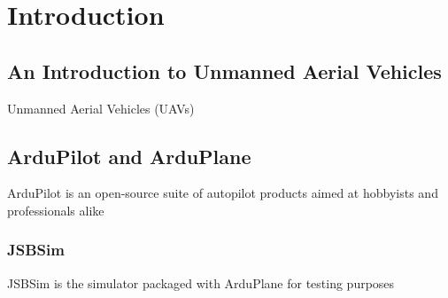 
\chapter{Introduction}  %
\label{intro}

\ifpdf
    \graphicspath{{Chapter1/Figs/Raster/}{Chapter1/Figs/PDF/}{Chapter1/Figs/}}
\else
    \graphicspath{{Chapter1/Figs/Vector/}{Chapter1/Figs/}}
\fi


\section{An Introduction to Unmanned Aerial Vehicles} %
\label{intro:UAVs}

Unmanned Aerial Vehicles (UAVs) 

\section{ArduPilot and ArduPlane} %
\label{intro:arduplane}

ArduPilot is an open-source suite of autopilot products aimed at hobbyists and professionals alike 

\subsection{JSBSim}
\label{intro:jsbsim}

JSBSim is the simulator packaged with ArduPlane for testing purposes

